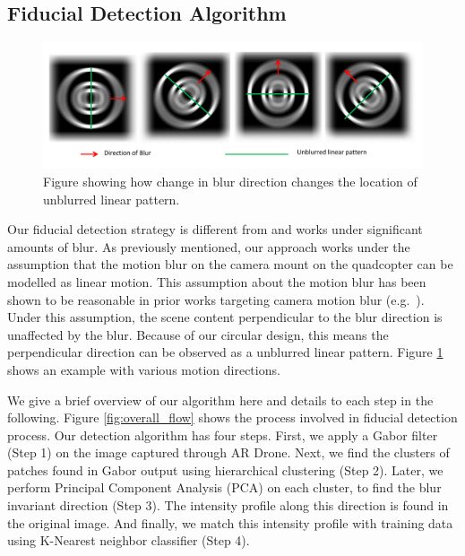 \documentclass[runningheads]{llncs}
\begin{document}
\subsection{Fiducial Detection Algorithm}

\begin{figure}
\centering
\includegraphics[width=\linewidth]{blur_direction.pdf}
\caption{Figure showing how change in blur direction changes the location of
unblurred linear pattern.}
\label{fig:blur_direction}
\end{figure}

Our fiducial detection strategy is different from \cite{NaimarkF02,Pitag13} and works
under significant amounts of blur.   As previously mentioned, our approach works
 under the assumption that the motion blur on the camera mount on the quadcopter
 can be modelled as linear motion.  This assumption about the motion blur has been shown to be
 reasonable in prior works targeting camera motion blur (e.g.~\cite{Moshe:2003,Moshe:2004}).
Under this assumption, the scene content perpendicular to the blur direction is
unaffected by the blur.  Because of our circular design, this means the
perpendicular direction can be observed as a unblurred linear pattern.  Figure
\ref{fig:blur_direction} shows an example with various motion directions.

We give a brief overview of our algorithm here and details to each step in the
following. Figure \ref{fig:overall_flow} shows the process involved in fiducial
detection process. Our detection algorithm has four steps. First, we apply a
Gabor filter (Step 1) on the image captured through AR Drone. Next, we find the
clusters of patches found in Gabor output using hierarchical clustering (Step
2). Later, we perform Principal Component Analysis (PCA) on each cluster, to
find the blur invariant direction (Step 3). The intensity profile along this
direction is found in the original image. And finally, we match this intensity
profile with training data using K-Nearest neighbor classifier (Step 4). 
\end{document}
